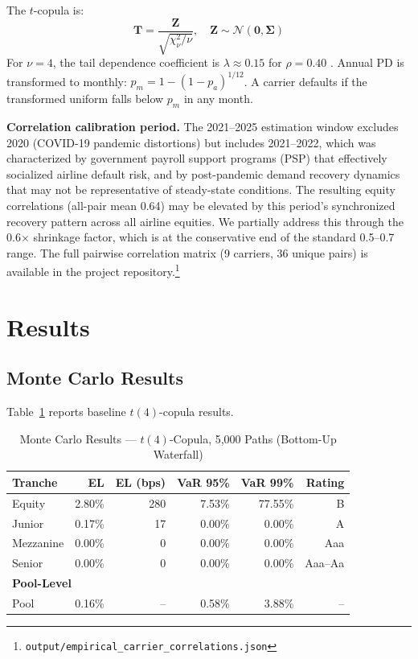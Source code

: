 \documentclass[12pt,a4paper]{article}
\begin{document}
The $t$-copula is:
\begin{equation}
\mathbf{T} = \frac{\mathbf{Z}}{\sqrt{\chi^2_\nu / \nu}}, \quad \mathbf{Z} \sim \mathcal{N}(\mathbf{0}, \mathbf{\Sigma})
\label{eq:t_copula}
\end{equation}
For $\nu = 4$, the tail dependence coefficient is $\lambda \approx 0.15$ for $\rho = 0.40$ \cite{demarta2005}. Annual PD is transformed to monthly: $p_m = 1 - (1 - p_a)^{1/12}$. A carrier defaults if the transformed uniform falls below $p_m$ in any month.

\textbf{Correlation calibration period.} The 2021--2025 estimation window excludes 2020 (COVID-19 pandemic distortions) but includes 2021--2022, which was characterized by government payroll support programs (PSP) that effectively socialized airline default risk, and by post-pandemic demand recovery dynamics that may not be representative of steady-state conditions. The resulting equity correlations (all-pair mean 0.64) may be elevated by this period's synchronized recovery pattern across all airline equities. We partially address this through the 0.6$\times$ shrinkage factor, which is at the conservative end of the standard 0.5--0.7 range. The full pairwise correlation matrix (9 carriers, 36 unique pairs) is available in the project repository.\footnote{\texttt{output/empirical\_carrier\_correlations.json}}

\section{Results}

\subsection{Monte Carlo Results}

Table~\ref{tab:mc_results} reports baseline $t(4)$-copula results.

\begin{table}[H]
\centering
\caption{Monte Carlo Results --- $t(4)$-Copula, 5,000 Paths (Bottom-Up Waterfall)}
\label{tab:mc_results}
\begin{tabular}{lrrrrr}
\toprule
\textbf{Tranche} & \textbf{EL} & \textbf{EL (bps)} & \textbf{VaR 95\%} & \textbf{VaR 99\%} & \textbf{Rating} \\
\midrule
Equity    & 2.80\% & 280 &  7.53\% & 77.55\% & B \\
Junior    & 0.17\% &  17 &  0.00\% &  0.00\% & A \\
Mezzanine & 0.00\% &   0 &  0.00\% &  0.00\% & Aaa \\
Senior    & 0.00\% &   0 &  0.00\% &  0.00\% & Aaa--Aa \\
\midrule
\multicolumn{6}{l}{\textbf{Pool-Level}} \\
Pool      & 0.16\% & --  &  0.58\% &  3.88\% & -- \\
\bottomrule
\end{tabular}
\end{table}
\end{document}
